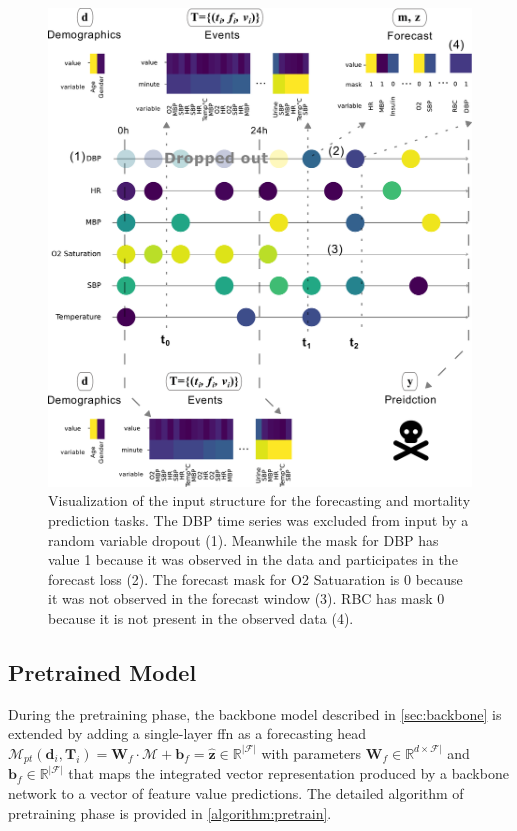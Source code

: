 \begin{figure}
    \centering
    \includegraphics[width=\textwidth]{./figures/model_input}
    \caption{Visualization of the input structure for the forecasting and mortality prediction tasks.
    The DBP time series was excluded from input by a random variable dropout (1). Meanwhile  the mask for DBP has value 1 because it was observed in the data and participates in the forecast loss (2). The forecast mask for O2 Satuaration is 0 because it was not observed in the forecast window (3). RBC has mask 0 because it is not present in the observed data (4).}
    \label{fig:model_input}
\end{figure}

\subsection{Pretrained Model}

During the pretraining phase, the backbone model described in \cref{sec:backbone} is extended by adding a single-layer \gls{ffn} as a forecasting head \( \mathcal{M}_{pt}(\mathbf{d}_i, \mathbf{T}_i) = \mathbf{W}_f \cdot \mathcal{M} + \mathbf{b}_f = \hat{\mathbf{z}} \in \mathbb{R}^{|\mathcal{F}|} \) with parameters \( \mathbf{W}_f \in \mathbb{R}^{d \times \mathcal{F}|} \) and \( \mathbf{b}_f \in \mathbb{R}^{|\mathcal{F}|} \) that maps the integrated vector representation produced by a backbone network to a vector of feature value predictions. The detailed algorithm of pretraining phase is provided in \cref{algorithm:pretrain}.

